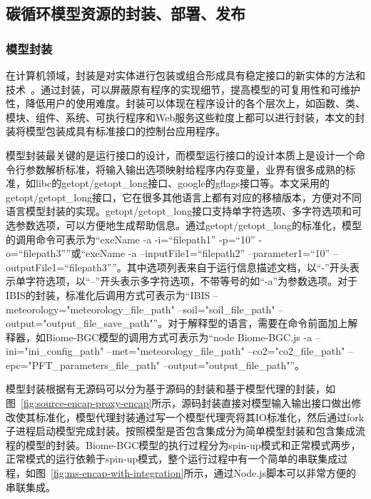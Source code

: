 \subsection{碳循环模型资源的封装、部署、发布}
\label{subsec:ms-encap}
\subsubsection{模型封装}

在计算机领域，封装是对实体进行包装或组合形成具有稳定接口的新实体的方法和技术~\cite{胡迪2015地理模型的服务化封装方法研究}。通过封装，可以屏蔽原有程序的实现细节，提高模型的可复用性和可维护性，降低用户的使用难度。封装可以体现在程序设计的各个层次上，如函数、类、模块、组件、系统、可执行程序和Web服务这些粒度上都可以进行封装，本文的封装将模型包装成具有标准接口的控制台应用程序。

模型封装最关键的是运行接口的设计，而模型运行接口的设计本质上是设计一个命令行参数解析标准，将输入输出选项映射给程序内存变量，业界有很多成熟的标准，如libc的getopt/getopt\_long接口、google的gflags接口等。本文采用的getopt/getopt\_long接口，它在很多其他语言上都有对应的移植版本，方便对不同语言模型封装的实现。getopt/getopt\_long接口支持单字符选项、多字符选项和可选参数选项，可以方便地生成帮助信息。通过getopt/getopt\_long的标准化，模型的调用命令可表示为“exeName -a -i=``filepath1'' -p=``10'' -o=``filepath3''”或“exeName -a --inputFile1=``filepath2'' --parameter1=``10'' --outputFile1=``filepath3''”。其中选项列表来自于运行信息描述文档，以“-”开头表示单字符选项，以“--”开头表示多字符选项，不带等号的如“-a”为参数选项。对于IBIS的封装，标准化后调用方式可表示为“IBIS --meteorology="meteorology\_file\_path" --soil="soil\_file\_path" --output="output\_file\_save\_path"”。对于解释型的语言，需要在命令前面加上解释器，如Biome-BGC模型的调用方式可表示为“node Biome-BGC.js -a --ini="ini\_config\_path" --met="meteorology\_file\_path" --co2="co2\_file\_path" --epc="PFT\_parameters\_file\_path" --output="output\_file\_path"”。

模型封装根据有无源码可以分为基于源码的封装和基于模型代理的封装，如图~\ref{fig:source-encap-proxy-encap}所示，源码封装直接对模型输入输出接口做出修改使其标准化，模型代理封装通过写一个模型代理壳将其IO标准化，然后通过fork子进程启动模型完成封装。按照模型是否包含集成分为简单模型封装和包含集成流程的模型的封装。Biome-BGC模型的执行过程分为spin-up模式和正常模式两步，正常模式的运行依赖于spin-up模式，整个运行过程中有一个简单的串联集成过程，如图~\ref{fig:ms-encap-with-integration}所示，通过Node.js脚本可以非常方便的串联集成。


